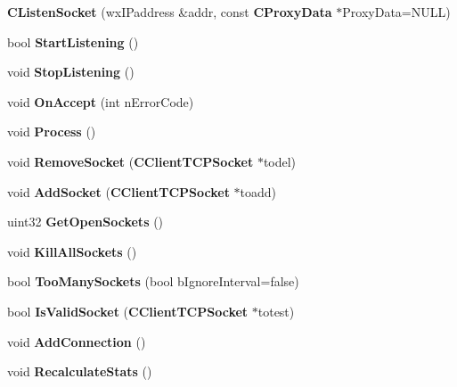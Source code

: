 \begin{DoxyCompactItemize}
\item 
{\bfseries CListenSocket} (wxIPaddress \&addr, const {\bf CProxyData} $\ast$ProxyData=NULL)\label{classCListenSocket_abed8dde0fddd6f0c48259a9c8bffae27}

\item 
bool {\bfseries StartListening} ()\label{classCListenSocket_af6edfc4b70f7c8d63680f9de588972ee}

\item 
void {\bfseries StopListening} ()\label{classCListenSocket_aff25129b0e3073d23f49a2b51d41b777}

\item 
void {\bfseries OnAccept} (int nErrorCode)\label{classCListenSocket_a972791faffb049c20e29ae643c21fcd0}

\item 
void {\bfseries Process} ()\label{classCListenSocket_af2fb5ea16956bd7d7ecff0ac792000a0}

\item 
void {\bfseries RemoveSocket} ({\bf CClientTCPSocket} $\ast$todel)\label{classCListenSocket_ad973550ed7deb86a84c17569c974c24f}

\item 
void {\bfseries AddSocket} ({\bf CClientTCPSocket} $\ast$toadd)\label{classCListenSocket_ab43084c687c501f6371abae450719305}

\item 
uint32 {\bfseries GetOpenSockets} ()\label{classCListenSocket_a76d62bfe6f7da88fd51c75d3eeb905cc}

\item 
void {\bfseries KillAllSockets} ()\label{classCListenSocket_ae6cf87308b1eddbb21e802f17347f162}

\item 
bool {\bfseries TooManySockets} (bool bIgnoreInterval=false)\label{classCListenSocket_a941d953046dfcc55b33528f6c9d20faa}

\item 
bool {\bfseries IsValidSocket} ({\bf CClientTCPSocket} $\ast$totest)\label{classCListenSocket_ad606d8021065d7bb02a3fad8dea9c177}

\item 
void {\bfseries AddConnection} ()\label{classCListenSocket_a0a44f2499ea59f99c8a9a7fd8da3f8f8}

\item 
void {\bfseries RecalculateStats} ()\label{classCListenSocket_a4d921b1418aa9c87dafefb127e4a5030}


\end{DoxyCompactItemize}
